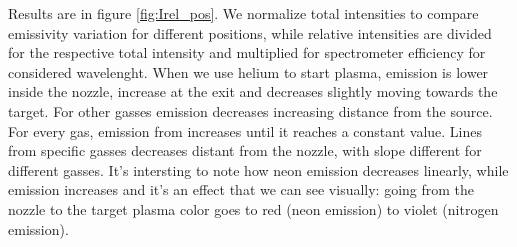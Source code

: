 Results are in figure \ref{fig:Irel_pos}. We normalize total intensities to compare emissivity variation for different positions, while relative intensities are divided for the respective total intensity and multiplied for spectrometer efficiency for considered wavelenght.
When we use helium to start plasma, emission is lower inside the nozzle, increase at the exit and decreases slightly moving towards the target. For other gasses emission decreases increasing distance from the source.
For every gas, emission from  increases until it reaches a constant value.
Lines from specific gasses decreases distant from the nozzle, with slope different for different gasses.
It's intersting to note how neon emission decreases linearly, while  emission increases and it's an effect that we can see visually: going from the nozzle to the target plasma color goes to red (neon emission) to violet (nitrogen emission).
